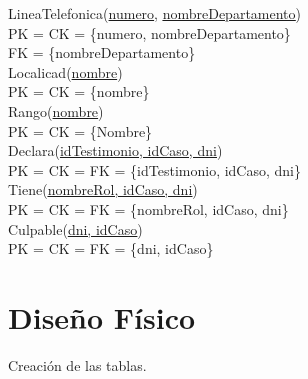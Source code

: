 \documentclass[10pt,a4paper]{article}
\begin{document}
\newline
LineaTelefonica(\underline{numero}, \underline{\underline{nombreDepartamento}})\\ 
	PK = CK = \{numero, nombreDepartamento\}\\ 
	FK = \{nombreDepartamento\}\\
\newline
Localicad(\underline{nombre})\\ 
	PK = CK = \{nombre\}\\ 
\newline
Rango(\underline{nombre})\\ 
	PK = CK = \{Nombre\}\\ 
\newline
Declara(\underline{\underline{idTestimonio, idCaso, dni}})\\ 
	PK = CK = FK = \{idTestimonio, idCaso, dni\}\\
\newline
Tiene(\underline{\underline{nombreRol, idCaso, dni}})\\ 
	PK = CK = FK = \{nombreRol, idCaso, dni\}\\ 
\newline
Culpable(\underline{\underline{dni, idCaso}})\\ 
	PK = CK = FK = \{dni, idCaso\}\\ 

\section{Diseño Físico}
Creación de las tablas.
\end{document}
